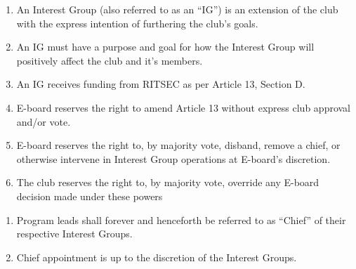 

\begin{enumerate}
      \item An Interest Group (also referred to as an ``IG'') is an extension of the club
            with the express intention of furthering the club's goals.
      \item An IG must have a purpose and goal for how the Interest Group will positively
            affect the club and it’s members.
      \item An IG receives funding from RITSEC as per Article 13, Section D.
      \item E-board reserves the right to amend Article 13 without express club approval
            and/or vote.
      \item E-board reserves the right to, by majority vote, disband, remove a chief, or
            otherwise intervene in Interest Group operations at E-board's discretion.
      \item The club reserves the right to, by majority vote, override any E-board decision
            made under these powers
\end{enumerate}


\begin{enumerate}
      \item Program leads shall forever and henceforth be referred to as ``Chief'' of their
            respective Interest Groups.
      \item Chief appointment is up to the discretion of the Interest Groups.
\end{enumerate}


